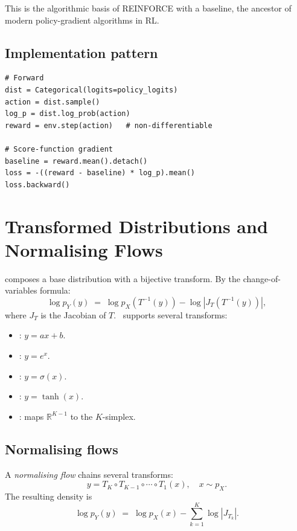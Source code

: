 This is the algorithmic basis of REINFORCE with a baseline, the
ancestor of modern policy-gradient algorithms in RL.

\subsection{Implementation pattern}
\label{ssec:distributions:score_pattern}

\begin{lstlisting}[style=lucid,language=LucidPython]
# Forward
dist = Categorical(logits=policy_logits)
action = dist.sample()
log_p = dist.log_prob(action)
reward = env.step(action)   # non-differentiable

# Score-function gradient
baseline = reward.mean().detach()
loss = -((reward - baseline) * log_p).mean()
loss.backward()
\end{lstlisting}

\section{Transformed Distributions and Normalising Flows}
\label{sec:distributions:flows}

 composes a base
distribution with a bijective transform. By the change-of-variables
formula:
\[
\log p_Y(y) \;=\; \log p_X(T^{-1}(y)) - \log |J_T(T^{-1}(y))|,
\]
where $J_T$ is the Jacobian of $T$. \Lucid\ supports several
transforms:

\begin{itemize}
  \item {}: $y = a x + b$.
  \item {}: $y = e^x$.
  \item {}: $y = \sigma(x)$.
  \item {}: $y = \tanh(x)$.
  \item {}: maps $\mathbb{R}^{K-1}$
    to the $K$-simplex.
\end{itemize}

\subsection{Normalising flows}
\label{ssec:distributions:flow_arch}

A \emph{normalising flow} chains several transforms:
\[
y = T_K \circ T_{K-1} \circ \cdots \circ T_1(x), \quad
x \sim p_X.
\]
The resulting density is
\[
\log p_Y(y) \;=\; \log p_X(x) - \sum_{k=1}^K \log |J_{T_k}|.
\]

